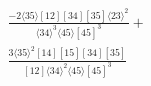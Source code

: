 \documentclass[varwidth, border=5pt]{standalone}
\begin{document}
\begin{my}
$\begin{gathered}
\scriptscriptstyle\frac{-2⟨35⟩[12][34][35]⟨23⟩^2}{⟨34⟩^3⟨45⟩[45]^3}+\\
\scriptscriptstyle\frac{3⟨35⟩^2[14][15][34][35]}{[12]⟨34⟩^2⟨45⟩[45]^3}\phantom{+}
\end{gathered}$
\end{my}
\end{document}
